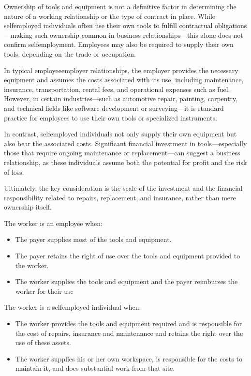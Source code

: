 \documentclass[letterpaper,10pt,english]{sphinxmanual}
\begin{document}
\sphinxAtStartPar
{}

\sphinxAtStartPar
Ownership of tools and equipment is not a definitive factor in determining the nature of a working relationship or the type
of contract in place. While self\sphinxhyphen{}employed individuals often use their own tools to fulfill contractual obligations—making
such ownership common in business relationships—this alone does not confirm self\sphinxhyphen{}employment. Employees may also be required
to supply their own tools, depending on the trade or occupation.

\sphinxAtStartPar
In typical employee\sphinxhyphen{}employer relationships, the employer provides the necessary equipment and assumes the costs associated
with its use, including maintenance, insurance, transportation, rental fees, and operational expenses such as fuel. However,
in certain industries—such as automotive repair, painting, carpentry, and technical fields like software development or
surveying—it is standard practice for employees to use their own tools or specialized instruments.

\sphinxAtStartPar
In contrast, self\sphinxhyphen{}employed individuals not only supply their own equipment but also bear the associated costs. Significant
financial investment in tools—especially those that require ongoing maintenance or replacement—can suggest a business
relationship, as these individuals assume both the potential for profit and the risk of loss.

\sphinxAtStartPar
Ultimately, the key consideration is the scale of the investment and the financial responsibility related to repairs,
replacement, and insurance, rather than mere ownership itself.

\sphinxAtStartPar
The worker is an employee when:
\begin{itemize}
\item {} 
\sphinxAtStartPar
The payer supplies most of the tools and equipment.

\item {} 
\sphinxAtStartPar
The payer retains the right of use over the tools and equipment provided to the worker.

\item {} 
\sphinxAtStartPar
The worker supplies the tools and equipment and the payer reimburses the worker for their use

\end{itemize}

\sphinxAtStartPar
The worker is a self\sphinxhyphen{}employed individual when:
\begin{itemize}
\item {} 
\sphinxAtStartPar
The worker provides the tools and equipment required and is responsible for the cost of repairs, insurance and maintenance and retains the right over the use of these assets.

\item {} 
\sphinxAtStartPar
The worker supplies his or her own workspace, is responsible for the costs to maintain it, and does substantial work from that site.

\end{itemize}
\end{document}
